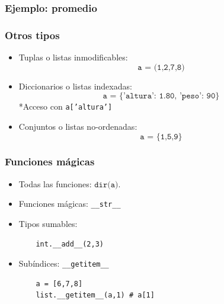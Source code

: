 \documentclass[14pt,aspectratio=169,xcolor=dvipsnames]{beamer}
\begin{document}
\begin{frame}\frametitle{Ejemplo: promedio}
\end{frame}
\begin{frame}\frametitle{Otros tipos}
    \begin{itemize}
        \item Tuplas o listas inmodificables: 
            $$  \texttt{a = (1,2,7,8)} $$
        \item Diccionarios o listas indexadas:
            $$ \texttt{a = \{'altura': 1.80, 'peso': 90\}} $$
            *Acceso con \texttt{a['altura']}
        \item Conjuntos o listas no-ordenadas: 
            $$ \texttt{a = \{1,5,9\}} $$
    \end{itemize}

\pause{}
\end{frame}
\begin{frame}[fragile]\frametitle{Funciones mágicas}

\begin{itemize}
    \item Todas las funciones: $\texttt{dir(a)}$.
    \item Funciones mágicas: \verb+__str__+
    \item Tipos sumables: %
        \begin{verbatim}
    int.__add__(2,3)
        \end{verbatim}
    \item Subíndices: \verb+__getitem__+
        \begin{verbatim}
    a = [6,7,8]
    list.__getitem__(a,1) # a[1]
        \end{verbatim}
\end{itemize}

\vspace{2cm}
\end{frame}
\end{document}
